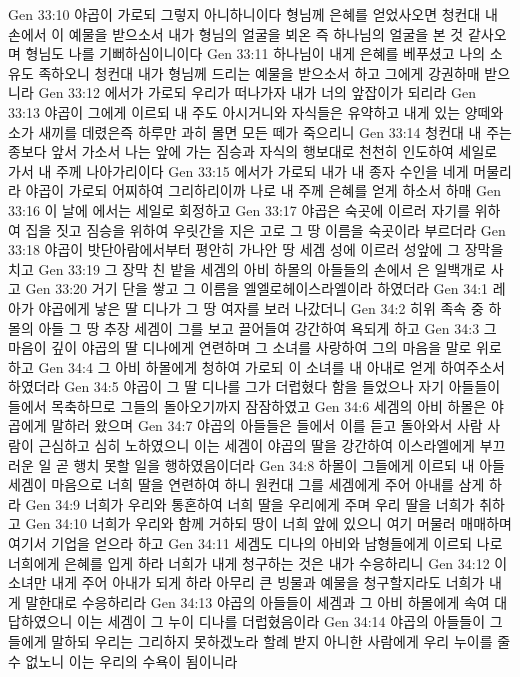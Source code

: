 Gen 33:10  야곱이 가로되 그렇지 아니하니이다 형님께 은혜를 얻었사오면 청컨대 내 손에서 이 예물을 받으소서 내가 형님의 얼굴을 뵈온 즉 하나님의 얼굴을 본 것 같사오며 형님도 나를 기뻐하심이니이다
Gen 33:11  하나님이 내게 은혜를 베푸셨고 나의 소유도 족하오니 청컨대 내가 형님께 드리는 예물을 받으소서 하고 그에게 강권하매 받으니라
Gen 33:12  에서가 가로되 우리가 떠나가자 내가 너의 앞잡이가 되리라
Gen 33:13  야곱이 그에게 이르되 내 주도 아시거니와 자식들은 유약하고 내게 있는 양떼와 소가 새끼를 데렸은즉 하루만 과히 몰면 모든 떼가 죽으리니
Gen 33:14  청컨대 내 주는 종보다 앞서 가소서 나는 앞에 가는 짐승과 자식의 행보대로 천천히 인도하여 세일로 가서 내 주께 나아가리이다
Gen 33:15  에서가 가로되 내가 내 종자 수인을 네게 머물리라 야곱이 가로되 어찌하여 그리하리이까 나로 내 주께 은혜를 얻게 하소서 하매
Gen 33:16  이 날에 에서는 세일로 회정하고
Gen 33:17  야곱은 숙곳에 이르러 자기를 위하여 집을 짓고 짐승을 위하여 우릿간을 지은 고로 그 땅 이름을 숙곳이라 부르더라
Gen 33:18  야곱이 밧단아람에서부터 평안히 가나안 땅 세겜 성에 이르러 성앞에 그 장막을 치고
Gen 33:19  그 장막 친 밭을 세겜의 아비 하몰의 아들들의 손에서 은 일백개로 사고
Gen 33:20  거기 단을 쌓고 그 이름을 엘엘로헤이스라엘이라 하였더라
Gen 34:1  레아가 야곱에게 낳은 딸 디나가 그 땅 여자를 보러 나갔더니
Gen 34:2  히위 족속 중 하몰의 아들 그 땅 추장 세겜이 그를 보고 끌어들여 강간하여 욕되게 하고
Gen 34:3  그 마음이 깊이 야곱의 딸 디나에게 연련하며 그 소녀를 사랑하여 그의 마음을 말로 위로하고
Gen 34:4  그 아비 하몰에게 청하여 가로되 이 소녀를 내 아내로 얻게 하여주소서 하였더라
Gen 34:5  야곱이 그 딸 디나를 그가 더럽혔다 함을 들었으나 자기 아들들이 들에서 목축하므로 그들의 돌아오기까지 잠잠하였고
Gen 34:6  세겜의 아비 하몰은 야곱에게 말하러 왔으며
Gen 34:7  야곱의 아들들은 들에서 이를 듣고 돌아와서 사람 사람이 근심하고 심히 노하였으니 이는 세겜이 야곱의 딸을 강간하여 이스라엘에게 부끄러운 일 곧 행치 못할 일을 행하였음이더라
Gen 34:8  하몰이 그들에게 이르되 내 아들 세겜이 마음으로 너희 딸을 연련하여 하니 원컨대 그를 세겜에게 주어 아내를 삼게 하라
Gen 34:9  너희가 우리와 통혼하여 너희 딸을 우리에게 주며 우리 딸을 너희가 취하고
Gen 34:10  너희가 우리와 함께 거하되 땅이 너희 앞에 있으니 여기 머물러 매매하며 여기서 기업을 얻으라 하고
Gen 34:11  세겜도 디나의 아비와 남형들에게 이르되 나로 너희에게 은혜를 입게 하라 너희가 내게 청구하는 것은 내가 수응하리니
Gen 34:12  이 소녀만 내게 주어 아내가 되게 하라 아무리 큰 빙물과 예물을 청구할지라도 너희가 내게 말한대로 수응하리라
Gen 34:13  야곱의 아들들이 세겜과 그 아비 하몰에게 속여 대답하였으니 이는 세겜이 그 누이 디나를 더럽혔음이라
Gen 34:14  야곱의 아들들이 그들에게 말하되 우리는 그리하지 못하겠노라 할례 받지 아니한 사람에게 우리 누이를 줄 수 없노니 이는 우리의 수욕이 됨이니라
